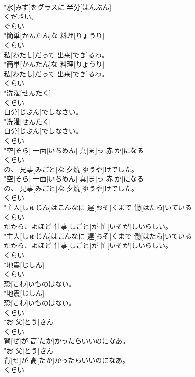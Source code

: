 \documentclass[8pt]{extreport}
\begin{document}
\begin{CJK}{UTF8}{min}
\\	"水[みず]をグラスに 半分[はんぶん]
\\	ください。
\\	ぐらい
\\	"簡単[かんたん]な 料理[りょうり]
\\	くらい
\\	私[わたし]だって 出来[でき]るわ。
\\	"簡単[かんたん]な 料理[りょうり]
\\	私[わたし]だって 出来[でき]るわ。
\\	くらい
\\	"洗濯[せんたく]
\\	くらい
\\	自分[じぶん]でしなさい。
\\	"洗濯[せんたく]
\\	自分[じぶん]でしなさい。
\\	くらい
\\	"空[そら] 一面[いちめん] 真[ま]っ 赤[か]になる
\\	くらい
\\	の、 見事[みごと]な 夕焼[ゆうや]けでした。
\\	"空[そら] 一面[いちめん] 真[ま]っ 赤[か]になる
\\	の、 見事[みごと]な 夕焼[ゆうや]けでした。
\\	くらい
\\	"主人[しゅじん]はこんなに 遅[おそ]くまで 働[はたら]いている
\\	くらい
\\	だから、よほど 仕事[しごと]が 忙[いそが]しいらしい。
\\	"主人[しゅじん]はこんなに 遅[おそ]くまで 働[はたら]いている
\\	だから、よほど 仕事[しごと]が 忙[いそが]しいらしい。
\\	くらい
\\	"地震[じしん]
\\	くらい
\\	恐[こわ]いものはない。
\\	"地震[じしん]
\\	恐[こわ]いものはない。
\\	くらい
\\	"お 父[とう]さん
\\	くらい
\\	背[せ]が 高[たか]かったらいいのになあ。
\\	"お 父[とう]さん
\\	背[せ]が 高[たか]かったらいいのになあ。
\\	くらい

\end{CJK}
\end{document}
